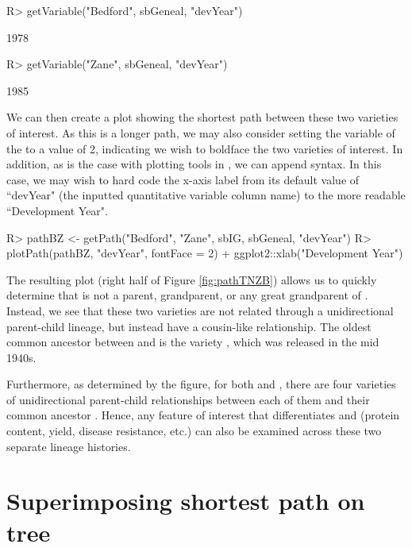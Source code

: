 \documentclass[article,shortnames]{jss}
\begin{document}
\begin{CodeChunk}
\begin{CodeInput}
R> getVariable("Bedford", sbGeneal, "devYear")
\end{CodeInput}
\begin{CodeOutput}
[1] 1978
\end{CodeOutput}
\begin{CodeInput}
R> getVariable("Zane", sbGeneal, "devYear")
\end{CodeInput}
\begin{CodeOutput}
[1] 1985
\end{CodeOutput}
\end{CodeChunk}

We can then create a plot showing the shortest path between these two varieties of interest. As this is a longer path, we may also consider setting the  variable of the  to a value of 2, indicating we wish to boldface the two varieties of interest. In addition, as is the case with plotting tools in , we can append  syntax. In this case, we may wish to hard code the x-axis label from its default value of ``devYear" (the inputted quantitative variable column name) to the more readable ``Development Year".

\begin{Code}
R> pathBZ <- getPath("Bedford", "Zane", sbIG, sbGeneal, "devYear")
R> plotPath(pathBZ, "devYear", fontFace = 2) + ggplot2::xlab("Development Year")
\end{Code}

The resulting plot (right half of Figure \ref{fig:pathTNZB}) allows us to quickly determine that  is not a parent, grandparent, or any great grandparent of . Instead, we see that these two varieties are not related through a unidirectional parent-child lineage, but instead have a cousin-like relationship. The oldest common ancestor between  and  is the variety , which was released in the mid 1940s.

Furthermore, as determined by the figure, for both  and , there are four varieties of unidirectional parent-child relationships between each of them and their common ancestor . Hence, any feature of interest that differentiates  and  (protein content, yield, disease resistance, etc.) can also be examined across these two separate lineage histories.

\section{Superimposing shortest path on tree}
\label{sspt}
\end{document}
